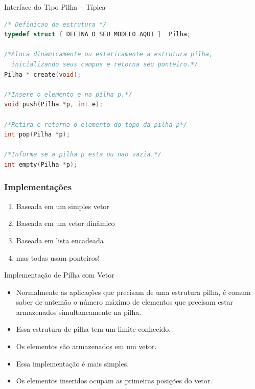 \begin{frame}{Interface do Tipo Pilha -- Típica}
\begin{lstlisting}[language=C]
/* Definicao da estrutura */
typedef struct { DEFINA O SEU MODELO AQUI }  Pilha;

/*Aloca dinamicamente ou estaticamente a estrutura pilha, 
  inicializando seus campos e retorna seu ponteiro.*/
Pilha * create(void);

/*Insere o elemento e na pilha p.*/
void push(Pilha *p, int e);

/*Retira e retorna o elemento do topo da pilha p*/
int pop(Pilha *p);

/*Informa se a pilha p esta ou nao vazia.*/
int empty(Pilha *p);
\end{lstlisting}
\end{frame}



\begin{frame}
\frametitle{Implementações} 


\begin{enumerate}

  \item Baseada em um simples vetor
    \item Baseada em um vetor dinâmico
      \item Baseada em lista encadeada
      \pause
      \item mas todas usam ponteiros!


\end{enumerate}


\end{frame}


\begin{frame}{Implementação de Pilha com Vetor}  
	\begin{itemize}
		\item Normalmente as aplicações que precisam de uma 
		estrutura pilha, é comum saber de antemão o número 
		máximo de elementos que precisam estar armazenados 
		simultaneamente na pilha.
		\item Essa estrutura de pilha tem um limite conhecido.
		\item Os elementos são armazenados em um vetor.
		\item Essa implementação é mais simples.
		\item Os elementos inseridos ocupam as primeiras posições do vetor. 
	\end{itemize}
\end{frame}

